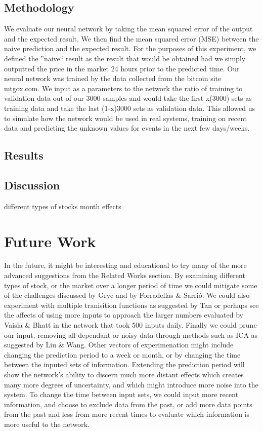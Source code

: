 \documentclass[a4paper,11pt]{article}
\begin{document}
\subsection{Methodology}
We evaluate our neural network by taking the mean squared error of the output and the expected result. We then find the mean squared error (MSE) between the naive prediction and the expected result. For the purposes of this experiment, we defined the ''naive`` result as the result that would be obtained had we simply outputted the price in the market 24 hours prior to the predicted time. 
Our neural network was trained by the data collected from the bitcoin site mtgox.com. We input as a parameters to the network the ratio of training to validation data out of our 3000 samples and would take the first x(3000) sets as training data and take the last (1-x)3000 sets as validation data. This allowed us to simulate  how the network would be used in real systems, training on recent data and predicting the unknown values for events in the next few days/weeks. 
\subsection{Results}
\subsection{Discussion}
different types of stocks
month effects


\section{Future Work}

In the future, it might be interesting and educational to try many of the more advanced suggestions from the Related Works section. By examining different types of stock, or the market over a longer period of time we could mitigate some of the challenges discussed by Gryc and  by Forradellas \& Sarrió. We could also experiment with multiple tranisition functions as suggested by Tan or perhaps see the affects of using more inputs to approach the larger numbers evaluated by Vaisla \& Bhatt in the network that took 500 inputs daily. Finally we could prune our input, removing all dependant or noisy data through methods such as ICA as suggested by Liu \& Wang. Other vectors of experimenation might include changing the prediction period to a week or month, or by changing the time between the inputed sets of information. Extending the prediction period will show the network's ability to discern much more distant effects which creates many more degrees of uncertainty, and which might introduce more noise into the 
system. To change the time between input sets, we could input more recent information, and choose to exclude data from the past, or add more data points from the past and less from more recent times to evaluate which information is more useful to the network.
\end{document}

